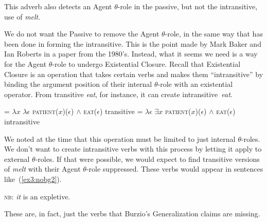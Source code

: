 This adverb also detects an Agent $\theta$-role in the passive, but not the intransitive, use of \emph{melt}.
\begin{exe}
	\raggedright
	\ex \label{ex3:intentmelt} 
	\begin{xlist}
	\end{xlist}
\end{exe}

We do not want the Passive to remove the Agent $\theta$-role, in the same way that has been done in forming the intransitive. This is the point made by Mark Baker and Ian Roberts in a paper from the 1980's.\cite{Baker:1989a} Instead, what it seems we need is a way for the Agent $\theta$-role to undergo Existential Closure. Recall that Existential Closure is an operation that takes certain verbs and makes them ``intransitive'' by binding the argument position of their internal $\theta$-role with an existential operator. From transitive \emph{eat}, for instance, it can create intransitive~\emph{eat}.
\begin{exe}
	\raggedright
	\ex \label{ex3:eatec}
	\begin{xlist}
		\ex 
		 = $\lambda x$ $\lambda \epsilon$ \textsc{patient}($x$)($\epsilon$) $\wedge$ \textsc{eat}($\epsilon$) \hfill{transitive}
		\ex \small
		 = $\lambda \epsilon$ $\exists x$ \textsc{patient}($x$)($\epsilon$) $\wedge$ \textsc{eat}($\epsilon$) \hfill{intransitive}
	\end{xlist}
\end{exe}

We noted at the time that this operation must be limited to just internal $\theta$-roles. We don't want to create intransitive verbs with this process by letting it apply to external $\theta$-roles. If that were possible, we would expect to find transitive versions of \emph{melt} with their Agent $\theta$-role suppressed. These verbs would appear in sentences like~(\ref{ex3:nobg2}).
\begin{exe}
	\raggedright
	 {\textsc{nb}: \emph{it} is an expletive.}
\end{exe}
These are, in fact, just the verbs that Burzio's Generalization claims are missing.


